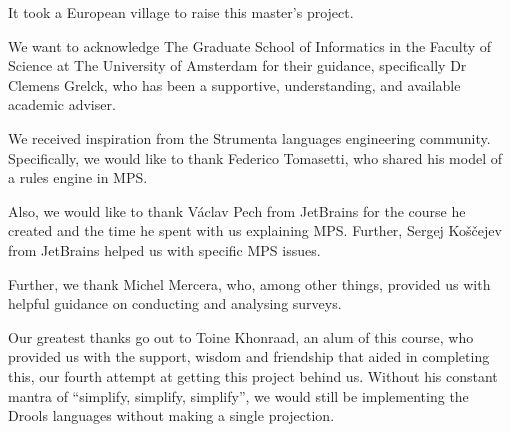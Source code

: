 \begin{acknowledgements}
\addchaptertocentry{\acknowledgementname}
It took a European village to raise this master's project.


We want to acknowledge The Graduate School of Informatics in the Faculty of Science at The University of Amsterdam for their guidance, specifically Dr Clemens Grelck, who has been a supportive, understanding, and available academic adviser.


We received inspiration from the Strumenta languages engineering community.
Specifically, we would like to thank Federico Tomasetti, who shared his model of a rules engine in MPS.


Also, we would like to thank Václav Pech from JetBrains for the course he created and the time he spent with us explaining MPS.
Further, Sergej Koščejev from JetBrains helped us with specific MPS issues.


Further, we thank Michel Mercera, who, among other things, provided us with helpful guidance on conducting and analysing surveys.


Our greatest thanks go out to Toine Khonraad, an alum of this course, who provided us with the support, wisdom and friendship that aided in completing this, our fourth attempt at getting this project behind us.
Without his constant mantra of ``simplify, simplify, simplify'', we would still be implementing the Drools languages without making a single projection.
\end{acknowledgements}